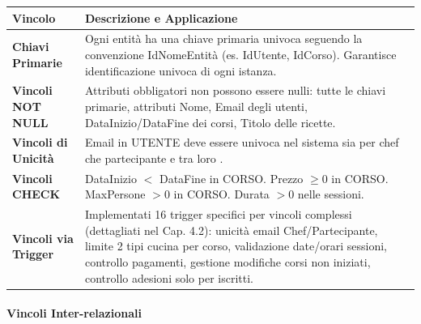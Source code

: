 \begin{center}
\begin{tcolorbox}[colback=white!98!gray, colframe=myblue!80!black, title=Vincoli Intra-relazionali, arc=4mm, boxrule=0.8pt, width=0.98\textwidth]
\renewcommand{\arraystretch}{1.2}
\begin{tabularx}{\textwidth}{p{4cm}X}
\textbf{Vincolo} & \textbf{Descrizione e Applicazione} \\
\hline
\textbf{Chiavi Primarie} & Ogni entità ha una chiave primaria univoca seguendo la convenzione IdNomeEntità (es. IdUtente, IdCorso). Garantisce identificazione univoca di ogni istanza. \\
\hline
\textbf{Vincoli NOT NULL} & Attributi obbligatori non possono essere nulli: tutte le chiavi primarie, attributi Nome, Email degli utenti, DataInizio/DataFine dei corsi, Titolo delle ricette. \\
\hline
\textbf{Vincoli di Unicità} & Email in UTENTE deve essere univoca nel sistema sia per chef che partecipante e tra loro . \\
\hline
\textbf{Vincoli CHECK} & DataInizio $<$ DataFine in CORSO. Prezzo $\geq 0$ in CORSO. MaxPersone $> 0$ in CORSO. Durata $> 0$ nelle sessioni. \\
\hline
\textbf{Vincoli via Trigger} & Implementati 16 trigger specifici per vincoli complessi (dettagliati nel Cap. 4.2): unicità email Chef/Partecipante, limite 2 tipi cucina per corso, validazione date/orari sessioni, controllo pagamenti, gestione modifiche corsi non iniziati, controllo adesioni solo per iscritti. \\
\hline
\end{tabularx}
\end{tcolorbox}
\end{center}

\paragraph{Vincoli Inter-relazionali}

